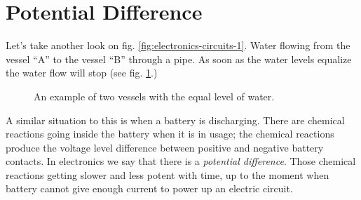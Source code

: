 \documentclass[../sparc.tex]{subfiles}
\begin{document}
\section{Potential Difference}

Let's take another look on fig. \ref{fig:electronics-circuits-1}.  Water flowing
from the vessel ``A'' to the vessel ``B'' through a pipe.  As soon as the water
levels equalize the water flow will stop (see
fig. \ref{fig:electronics-circuits-2}.)

\begin{figure}[ht]
  \centering
  \caption{An example of two vessels with the equal level of water.}
  \label{fig:electronics-circuits-2}
\end{figure}

A similar situation to this is when a battery is discharging.  There are
chemical reactions going inside the battery when it is in usage; the chemical
reactions produce the voltage level difference between positive and negative
battery contacts.  In electronics we say that there is a \emph{potential
difference}.  Those chemical reactions getting slower and less potent with time,
up to the moment when battery cannot give enough current to power up an electric
circuit.
\end{document}
